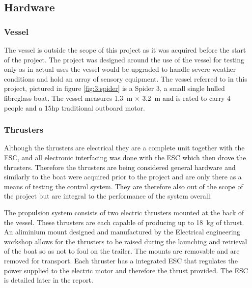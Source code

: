 	\subsection{Hardware}\par
		\subsubsection{Vessel}
		The vessel is outside the scope of this project as it was acquired before the start of the project. The project was designed around the use of the vessel for testing only as in actual uses the vessel would be upgraded to handle severe weather conditions and hold an array of sensory equipment. The vessel referred to in this project, pictured in figure \ref{fig:3:spider} is a Spider 3, a small single hulled fibreglass boat. The vessel measures \SI{1.3}{\meter} $\times$ \SI{3.2}{\meter} and is rated to carry 4 people and a 15hp traditional outboard motor.\par
		\subsubsection{Thrusters}
		Although the thrusters are electrical they are a complete unit together with the ESC, and all electronic interfacing was done with the ESC which then drove the thrusters. Therefore the thrusters are being considered general hardware and similarly to the boat were acquired prior to the project and are only there as a means of testing the control system. They are therefore also out of the scope of the project but are integral to the performance of the system overall.\par 
		The propulsion system consists of two electric thrusters mounted at the back of the vessel. These thrusters are each capable of producing up to \SI{18}{\kilogram} of thrust. An aliminium mount designed and manufactured by the Electrical engineering workshop allows for the thrusters to be raised during the launching and retrieval of the boat so as not to foul on the trailer. The mounts are removable and are removed for transport. Each thruster has a integrated ESC that regulates the power supplied to the electric motor and therefore the thrust provided. The ESC is detailed later in the report.
